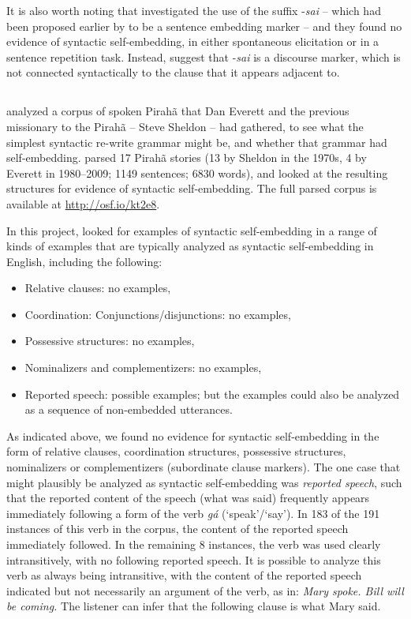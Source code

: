 \documentclass[output=paper]{langscibook}
\begin{document}
It is also worth noting that \citet{sakel2010piraha} investigated the use of the suffix -\textit{sai} -- which had been proposed earlier by \citet{everett1986piraha} to be a sentence embedding marker -- and they found no evidence of syntactic self-embedding, in either spontaneous elicitation or in a sentence repetition task. Instead, \citet{sakel2010piraha} suggest that -\textit{sai} is a discourse marker, which is not connected syntactically to the clause that it appears adjacent to.

\subsection{}

\citet{futrell2016corpus} analyzed a corpus of spoken Pirahã that Dan Everett and the previous missionary to the Pirahã -- Steve Sheldon -- had gathered, to see what the simplest syntactic re-write grammar might be, and whether that grammar had self-embedding. \citet{futrell2016corpus} parsed 17 Pirahã stories (13 by Sheldon in the 1970s, 4 by Everett in 1980--2009; 1149 sentences; 6830 words), and looked at the resulting structures for evidence of syntactic self-embedding. The full parsed corpus is available at \url{http://osf.io/kt2e8}.

In this project, \citet{futrell2016corpus} looked for examples of syntactic self\hyp embedding in a range of kinds of examples that are typically analyzed as syntactic self-embedding in English, including the following:

\begin{itemize}
    \item Relative clauses: no examples,
    \item Coordination: Conjunctions/disjunctions: no examples, 
    \item Possessive structures: no examples,
    \item Nominalizers and complementizers: no examples,
    \item Reported speech: possible examples; but the examples could also be analyzed as a sequence of non-embedded utterances.
\end{itemize} 

As indicated above, we found no evidence for syntactic self-embedding in the form of relative clauses, coordination structures, possessive structures, nominalizers or complementizers (subordinate clause markers). The one case that might plausibly be analyzed as syntactic self-embedding was \textit{reported speech}, such that the reported content of the speech (what was said) frequently appears immediately following a form of the verb \textit{gá} (`speak'/`say'). In 183 of the 191 instances of this verb in the corpus, the content of the reported speech immediately followed. In the remaining 8 instances, the verb was used clearly intransitively, with no following reported speech. It is possible to analyze this verb as always being intransitive, with the content of the reported speech indicated but not necessarily an argument of the verb, as in:  \textit{Mary spoke.  Bill will be coming.}  The listener can infer that the following clause is what Mary said.  
\end{document}

